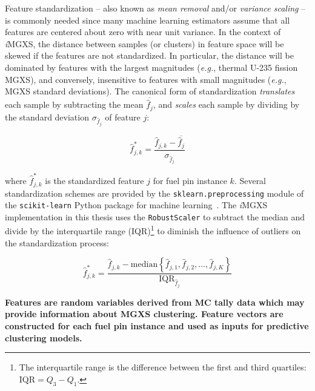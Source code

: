 Feature standardization -- also known as \textit{mean removal} and/or \textit{variance scaling} -- is commonly needed since many machine learning estimators assume that all features are centered about zero with near unit variance. In the context of \textit{i}\ac{MGXS}, the distance between samples (or clusters) in feature space will be skewed if the features are not standardized. In particular, the distance will be dominated by features with the largest magnitudes (\textit{e.g.}, thermal U-235 fission \ac{MGXS}), and conversely, insensitive to features with small magnitudes (\textit{e.g.}, \ac{MGXS} standard deviations). The canonical form of standardization \textit{translates} each sample by subtracting the mean $\overline{\hat{f}_{j}}$, and \textit{scales} each sample by dividing by the standard deviation $\sigma_{\hat{f}_{j}}$ of feature $j$:

\begin{equation}
\label{eqn:chap10-standard-standardize}
\hat{f}_{j,k}^{*} = \frac{\hat{f}_{j,k} - \overline{\hat{f}_{j}}}{\sigma_{\hat{f}_{j}}}
\end{equation}

\noindent where $\hat{f}_{j,k}^{*}$ is the standardized feature $j$ for fuel pin instance $k$. Several standardization schemes are provided by the \texttt{sklearn.preprocessing} module of the \texttt{scikit-learn} Python package for machine learning~\cite{pedregosa2011sklearn}. The \textit{i}\ac{MGXS} implementation in this thesis uses the \texttt{RobustScaler} to subtract the median and divide by the interquartile range (IQR)\footnote{The interquartile range is the difference between the first and third quartiles: $\mathrm{IQR} = Q_{3} - Q_{1}$.} to diminish the influence of outliers on the standardization process:

\begin{equation}
\label{eqn:chap10-robust-standardize}
\hat{f}_{j,k}^{*} = \frac{\hat{f}_{j,k} - \mathrm{median}\left\lbrace\hat{f}_{j,1}, \hat{f}_{j,2}, \dots, \hat{f}_{j,K}\right\rbrace}{\mathrm{IQR}_{\hat{f}_{j}}}
\end{equation}

\begin{emphbox}
\textbf{Features are random variables derived from \ac{MC} tally data which may provide information about \ac{MGXS} clustering. Feature vectors are constructed for each fuel pin instance and used as inputs for predictive clustering models.}
\end{emphbox}


